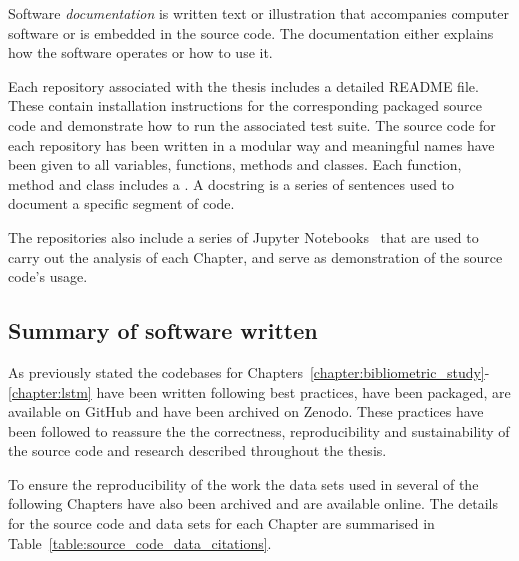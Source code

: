 Software \textit{documentation} is written text or illustration that accompanies
computer software or is embedded in the source code. The documentation either
explains how the software operates or how to use it.

Each repository associated with the thesis includes a detailed README file.
These contain installation instructions for the corresponding packaged source code
and demonstrate how to run the associated test suite. The source code for each
repository has been written in a modular way and meaningful names have been
given to all variables, functions, methods and classes. Each function, method
and class includes a . A docstring is a series of sentences used
to document a specific segment of code.

The repositories also include a series of Jupyter Notebooks~\cite{jupyter} that
are used to carry out the analysis of each Chapter, and serve as demonstration
of the source code's usage.

\subsection{Summary of software written}

As previously stated the codebases for
Chapters~\ref{chapter:bibliometric_study}-\ref{chapter:lstm} have been written
following best practices, have been packaged, are available on GitHub and have
been archived on Zenodo. These practices have been followed to reassure the the
correctness, reproducibility and sustainability of the source code and research
described throughout the thesis.

To ensure the reproducibility of the work the data sets used in several of
the following Chapters have also been archived and are available online. The details
for the source code and data sets for each Chapter are summarised in
Table~\ref{table:source_code_data_citations}.

